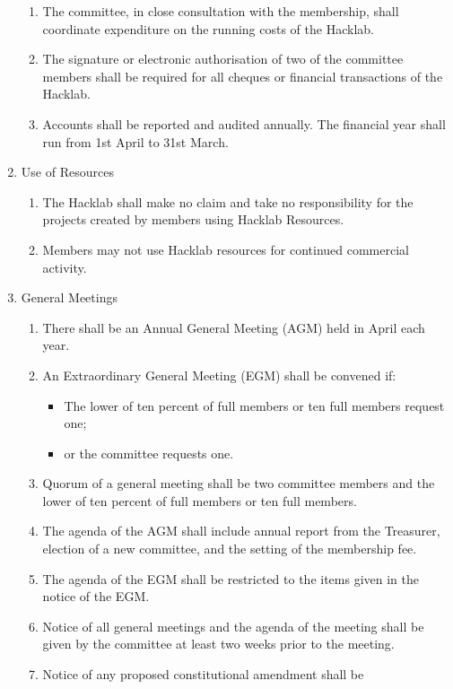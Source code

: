 \documentclass{article}
\begin{document}
\begin{enumerate}
\begin{enumerate}
    \item The committee, in close consultation with the membership, shall
      coordinate expenditure on the running costs of the Hacklab.
    \item The signature or electronic authorisation of two of the
      committee members shall be required for all cheques or
      financial transactions of the Hacklab.
    \item Accounts shall be reported and audited annually. The
      financial year shall run from 1st April to 31st March.
    \end{enumerate}
    \item Use of Resources
      \begin{enumerate}
      \item The Hacklab shall make no claim and take no responsibility
        for the projects created by members using Hacklab Resources.
      \item Members may not use Hacklab resources for continued
        commercial activity.
      \end{enumerate}
    \item General Meetings
      \begin{enumerate}
      \item There shall be an Annual General Meeting (AGM) held in
        April each year.
      \item An Extraordinary General Meeting (EGM) shall be convened if:
        \begin{itemize}
        \item The lower of ten percent of full members or ten full
          members request one;
        \item or the committee requests one.
        \end{itemize}
      \item Quorum of a general meeting shall be two committee members
        and the lower of ten percent of full members or ten full
        members.
      \item The agenda of the AGM shall include annual report from the
        Treasurer, election of a new committee, and the setting of the
        membership fee.
      \item The agenda of the EGM shall be restricted to the items
        given in the notice of the EGM.
      \item Notice of all general meetings and the agenda of the
        meeting shall be given by the committee at least two weeks
        prior to the meeting.
      \item Notice of any proposed constitutional amendment shall be

\end{enumerate}
\end{enumerate}
\end{document}
